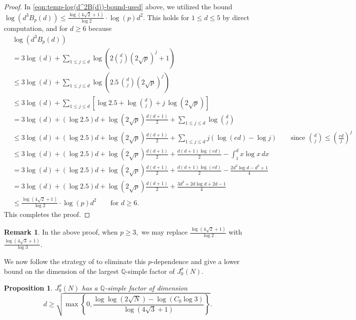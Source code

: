\documentclass[11pt,letterpaper,reqno]{amsart}
\newtheorem{proposition}[theorem]{Proposition}
\theoremstyle{definition}
\newtheorem{remark}[theorem]{Remark}
\numberwithin{equation}{section}
\numberwithin{figure}{section}
\numberwithin{table}{section}
\newcommand{\lrp}[1]{\left(#1\right)}
\newcommand{\lrb}[1]{\left[#1\right]}
\newcommand{\QQ}{\mathbb{Q}}
\begin{document}
\begin{proof}
In \eqref{eqn:temp-log(d^2B(d))-bound-used} above, we utilized the bound $\log(d^3 B_p(d)) \le \frac{\log (4\sqrt 2 + 1)}{\log 2} \cdot  \log (p)  d^2$. This holds for $1 \le d \le 5$ by direct computation, and for $d \ge 6$ because
\begin{align*}
    &\log\left( d^3 B_p(d) \right)\\
    &= 3 \log(d) + \sum_{1 \le j \le d} \log\left( 2 \binom{d}{j} (2\sqrt{p})^{j} + 1 \right) \\
    &\leq 3 \log(d) + \sum_{1 \le j \le d} \log\left( 2.5 \,  \binom{d}{j} (2\sqrt{p})^{j} \right) \\
    &\le 3 \log(d) + \sum_{1 \le j \le d} \lrb{ \log 2.5 + \log \binom{d}{j} + j\, \log\lrp{ 2\sqrt{p}}} \\
    &= 3 \log(d) + (\log 2.5) d + \log\lrp{ 2\sqrt{p}} \frac{d(d+1)}{2} + \sum_{1 \le j \le d} \log \binom{d}{j} \\
    &\le 3 \log(d) + (\log 2.5) d + \log\lrp{ 2\sqrt{p}} \frac{d(d+1)}{2} + \sum_{1 \le j \le d} j (\log(ed) - \log j ) \qquad \text{since $\binom{d}{j} \leq \left( \frac{ed}{j} \right)^j$}\\
    &\le 3 \log(d) + (\log 2.5) d + \log\lrp{ 2\sqrt{p}} \frac{d(d+1)}{2} + \frac{d(d+1) \log(ed)}{2} - \int_{1}^d x \log x\,dx \\
    &= 3 \log(d) + (\log 2.5) d + \log\lrp{ 2\sqrt{p}} \frac{d(d+1)}{2} + \frac{d(d+1) \log(ed)}{2} - \frac{2 d^2 \log d - d^2 + 1}{4} \\
    &= 3 \log(d) + (\log 2.5)d + \log\lrp{ 2\sqrt{p}} \frac{d(d+1)}{2} +  \frac{3d^2+2d \log d + 2d - 1}{4}\\
    &\le \frac{\log (4\sqrt 2 + 1)}{\log 2} \cdot  \log\lrp{p} d^2 \qquad \text{for $d \ge 6$}.
\end{align*}
This completes the proof.
\end{proof}

\begin{remark}\label{rmk:replace-3.17-if-p-not-2}
    In the above proof, when $p \geq 3,$ we may replace $\frac{\log (4\sqrt{2} + 1)}{\log 2}$ with $\frac{\log (4\sqrt 3 + 1)}{\log 3}.$
\end{remark}

We now follow the strategy of \cite[Corollary 7]{MS07} to eliminate this $p$-dependence and give a lower bound on the dimension of the largest $\QQ$-simple factor of $J_0^{\sigma}(N)$.

{
\renewcommand{\thetheorem}{\ref{prop:lower-bound-dimension-q-simple-factor}}
\begin{proposition}\label{full-sigma-jac-bound}
$J_0^{\sigma}(N)$ has a $\QQ$-simple factor of dimension 
$$d \geq \sqrt{\max \left\{ 0, \frac{\log \log (2 \sqrt{N} ) - \log (C_0 \log 3)}{\log (4\sqrt{3} + 1)} \right\} }.$$
\end{proposition}
\addtocounter{theorem}{-1}
}
\end{document}
